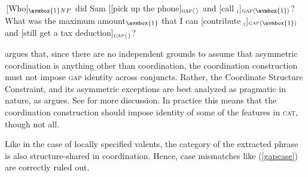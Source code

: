\documentclass[output=paper]{langsci/langscibook}
\begin{document}
\begin{exe}
\ex \begin{xlista}


\end{xlista}\label{cs2}
\end{exe}


\begin{exe}
\ex \begin{xlista}
\ex \,[Who]$_{\avmbox{1}NP}$ did Sam [[pick up the phone]$_{\textup{\textsc{gap}} \langle \, \rangle}$ and [call \spc$_i$]$_{\textup{\textsc{gap}} \langle \avmbox{1} \rangle}$?
\ex What was the maximum amount$_{\avmbox{1}}$ that
I can [contribute \spc$_i$]$_{\textup{\textsc{gap}} \langle \avmbox{1} \rangle}$ and [still get a tax deduction]$_{\textup{\textsc{gap}} \langle \, \rangle}$?
\end{xlista}\label{assym}
\end{exe}


\citet{chavesextr} argues that, since there are no independent grounds to assume that asymmetric coordination is anything other than coordination, the coordination construction must not impose \textsc{gap} identity across conjuncts. Rather, the Coordinate Structure Constraint, and its asymmetric exceptions are best analyzed as
pragmatic in nature, as \citet{kehler} argues. 
See  for more discussion.
In practice this means that the coordination construction should impose identity of some of the features in \textsc{cat}, though not all.

Like in the case of locally specified valents, the category of the extracted phrase is also structure-shared
in coordination. Hence, case mismatches like (\ref{gapcase}) are
correctly ruled out.


\begin{exe}
\ex
\begin{xlista}
\end{xlista}\label{gapcase}
\end{exe}
\end{document}
